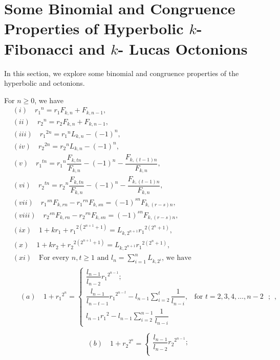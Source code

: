 \section{{Some Binomial and Congruence Properties of Hyperbolic $k$- Fibonacci and $k$- Lucas Octonions}}
In this section, we explore some binomial and congruence properties of the hyperbolic \kF\vspace{0mm} and \kL\vspace{0mm} octonions.
\begin{lemma}
For $n\ge 0$, we have\label{3.1l}
\begin{align*}
&(i)\quad {r_1}^n=r_1 {F}_{k,n}+{F}_{k,n-1},\\
&(ii)\quad {r_2}^n=r_2 {F}_{k,n}+{F}_{k,n-1},\\
&(iii)\quad {r_1}^{2n}={r_1}^n{L}_{k,n}-(-1)^n,\\
&(iv)\quad {r_2}^{2n}={r_2}^n{L}_{k,n}-(-1)^n,\\
&(v)\quad {r_1}^{tn}={r_1}^n\dfrac{{F}_{k,tn}}{{F}_{k,n}}-(-1)^n-\dfrac{{F}_{k,(t-1)n}}{{F}_{k,n}},\\
&(vi)\quad {r_2}^{tn}={r_2}^n\dfrac{{F}_{k,tn}}{{F}_{k,n}}-(-1)^n-\dfrac{{F}_{k,(t-1)n}}{{F}_{k,n}},\\
&(vii)\quad {r_1}^{sn}{F}_{k,rn}-{r_1}^{rn}{F}_{k,sn}=(-1)^{sn}{F}_{k,(r-s)n},\\
&(viii)\quad {r_2}^{sn}{F}_{k,rn}-{r_2}^{rn}{F}_{k,sn}=(-1)^{sn}{F}_{k,(r-s)n},\\
&(ix)\quad 1+k{r_1}+{r_1}^{2(2^{n+1}+1)}={L}_{k,2^{n+1}}{r_1}^{2(2^{n}+1)},\\
&(x)\quad 1+k{r_2}+{r_2}^{2(2^{n+1}+1)}={L}_{k,2^{n+1}}{r_1}^{2(2^{n}+1)},\\
&(xi) \quad \text{For every $n, t\geq 1$ and $l_n=\sum\limits_{i=1}^n{L}_{k,2^i}$, we have }\\
 &\quad (a)\quad 1+{r_1}^{2^n}= \begin{cases}
 \dfrac{l_{n-1}}{l_{n-2}}{r_1}^{2^{n-1}};\\
\dfrac{l_{n-1}}{l_{n-t-1}}{r_1}^{2^{n-t}}-l_{n-1}\sum\limits_{i=2}^{t}\dfrac{1}{l_{n-i}}, & \text{for $t=2, 3, 4,\hdots, n-2 $ };\\l_{n-1}{r_1}^2-l_{n-1}\sum\limits_{i=2}^{n-1}\dfrac{1}{l_{n-i}}
 \end{cases},\\
 \end{align*}
\begin{align*}
 &\quad (b)\quad 1+{r_2}^{2^n}= \begin{cases}
 \dfrac{l_{n-1}}{l_{n-2}}{r_2}^{2^{n-1}};\\

\end{cases}
\end{align*}
\end{lemma}
